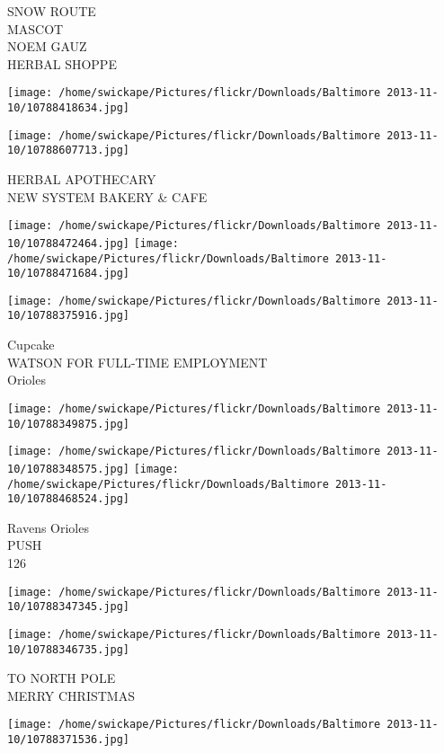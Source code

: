 \documentclass[10pt,letterpaper]{article}
\begin{document}
SNOW ROUTE\\
MASCOT\\
NOEM GAUZ\\
HERBAL SHOPPE
\pagebreak

\texttt{[image: /home/swickape/Pictures/flickr/Downloads/Baltimore 2013-11-10/10788418634.jpg]}

\vspace{0.25in}
\texttt{[image: /home/swickape/Pictures/flickr/Downloads/Baltimore 2013-11-10/10788607713.jpg]}

HERBAL APOTHECARY\\
NEW SYSTEM BAKERY \& CAFE
\pagebreak

\texttt{[image: /home/swickape/Pictures/flickr/Downloads/Baltimore 2013-11-10/10788472464.jpg]}
\texttt{[image: /home/swickape/Pictures/flickr/Downloads/Baltimore 2013-11-10/10788471684.jpg]}

\texttt{[image: /home/swickape/Pictures/flickr/Downloads/Baltimore 2013-11-10/10788375916.jpg]}

Cupcake\\
WATSON FOR FULL{-}TIME EMPLOYMENT\\
Orioles
\pagebreak

\texttt{[image: /home/swickape/Pictures/flickr/Downloads/Baltimore 2013-11-10/10788349875.jpg]}

\vspace{0.25in}
\texttt{[image: /home/swickape/Pictures/flickr/Downloads/Baltimore 2013-11-10/10788348575.jpg]}
\texttt{[image: /home/swickape/Pictures/flickr/Downloads/Baltimore 2013-11-10/10788468524.jpg]}

Ravens Orioles\\
PUSH\\
126
\pagebreak

\texttt{[image: /home/swickape/Pictures/flickr/Downloads/Baltimore 2013-11-10/10788347345.jpg]}

\vspace{0.25in}
\texttt{[image: /home/swickape/Pictures/flickr/Downloads/Baltimore 2013-11-10/10788346735.jpg]}

TO NORTH POLE\\
MERRY CHRISTMAS
\pagebreak

\texttt{[image: /home/swickape/Pictures/flickr/Downloads/Baltimore 2013-11-10/10788371536.jpg]}
\end{document}

